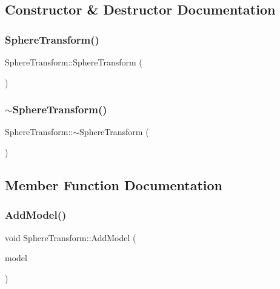 \subsection{Constructor \& Destructor Documentation}
\mbox{\label{class_sphere_transform_a0e4a906dda31dc3bdf36098e147dca5a}} 
\subsubsection{\texorpdfstring{SphereTransform()}{SphereTransform()}}
{\footnotesize\ttfamily Sphere\+Transform\+::\+Sphere\+Transform (\begin{DoxyParamCaption}{ }\end{DoxyParamCaption})}

\mbox{\label{class_sphere_transform_a7edb4e09f5df299e73121b35647b665d}} 
\subsubsection{\texorpdfstring{$\sim$SphereTransform()}{~SphereTransform()}}
{\footnotesize\ttfamily Sphere\+Transform\+::$\sim$\+Sphere\+Transform (\begin{DoxyParamCaption}{ }\end{DoxyParamCaption})}



\subsection{Member Function Documentation}
\mbox{\label{class_sphere_transform_a77f692a85c566d476a974951e961c22b}} 
\subsubsection{\texorpdfstring{AddModel()}{AddModel()}}
{\footnotesize\ttfamily void Sphere\+Transform\+::\+Add\+Model (\begin{DoxyParamCaption}\item[{\mbox{\hyperlink{class_sphere_model}{Sphere\+Model}} $\ast$}]{model }\end{DoxyParamCaption})}

